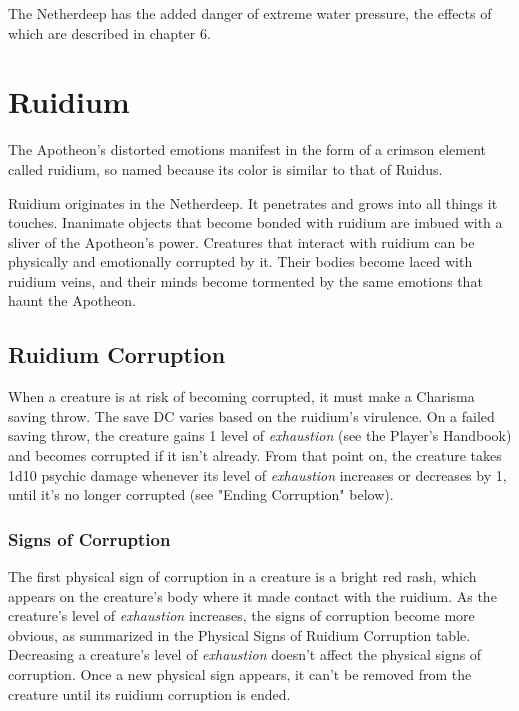 \documentclass[letterpaper, 11pt, bg=full, twocolumn]{dndbook}
\begin{document}
The Netherdeep has the added danger of extreme water pressure, the effects of which are described in chapter 6.
\section{Ruidium}

The Apotheon's distorted emotions manifest in the form of a crimson element called ruidium, so named because its color is similar to that of Ruidus.

Ruidium originates in the Netherdeep. It penetrates and grows into all things it touches. Inanimate objects that become bonded with ruidium are imbued with a sliver of the Apotheon's power. Creatures that interact with ruidium can be physically and emotionally corrupted by it. Their bodies become laced with ruidium veins, and their minds become tormented by the same emotions that haunt the Apotheon.

\subsection{Ruidium Corruption}

When a creature is at risk of becoming corrupted, it must make a Charisma saving throw. The save DC varies based on the ruidium's virulence. On a failed saving throw, the creature gains 1 level of \textit{exhaustion} (see the Player's Handbook) and becomes corrupted if it isn't already. From that point on, the creature takes 1d10 psychic damage whenever its level of \textit{exhaustion} increases or decreases by 1, until it's no longer corrupted (see "Ending Corruption" below).

\subsubsection{Signs of Corruption}

The first physical sign of corruption in a creature is a bright red rash, which appears on the creature's body where it made contact with the ruidium. As the creature's level of \textit{exhaustion} increases, the signs of corruption become more obvious, as summarized in the Physical Signs of Ruidium Corruption table. Decreasing a creature's level of \textit{exhaustion} doesn't affect the physical signs of corruption. Once a new physical sign appears, it can't be removed from the creature until its ruidium corruption is ended.
\end{document}
